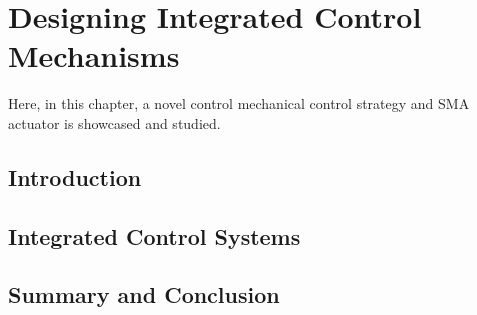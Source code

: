 
\chapter{Designing Integrated Control Mechanisms}
Here, in this chapter, a novel control mechanical control strategy and SMA actuator is showcased and studied.
\section{Introduction}
\section{Integrated Control Systems}
\section{Summary and Conclusion}
